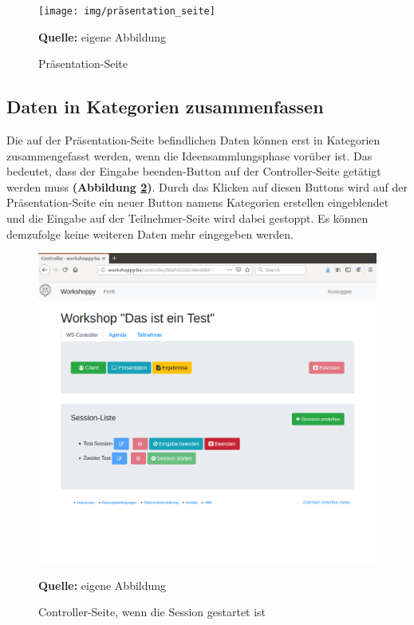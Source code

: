 \begin{figure}[H]
  \begin{center}
    \texttt{[image: img/präsentation\_seite]}
	\caption{Präsentation-Seite} 
	\footnotesize\sffamily\textbf{Quelle:} eigene Abbildung
	\label{fig:Präsentation-Seite final}
  \end{center}   
\end{figure}

\newpage
\subsection{Daten in Kategorien zusammenfassen}
\label{subsec:Daten in Kategorien zusammenfassen}
Die auf der Präsentation-Seite befindlichen Daten können erst in Kategorien zusammengefasst werden, wenn die Ideensammlungsphase vorüber ist. Das bedeutet, dass der \glqq Eingabe beenden\grqq{}-Button auf der Controller-Seite getätigt werden muss \textbf{(Abbildung \ref{fig:controller-Seite mit session final})}. Durch das Klicken auf diesen Buttons wird auf der Präsentation-Seite ein neuer Button namens \glqq Kategorien erstellen\grqq{} eingeblendet und die Eingabe auf der Teilnehmer-Seite wird dabei gestoppt. Es können demzufolge keine weiteren Daten mehr eingegeben werden. 

\bigskip
\begin{figure}[H]
  \begin{center}
    \includegraphics[scale=0.35]{img/controller_seite1}
	\caption{Controller-Seite, wenn die Session gestartet ist} 
	\footnotesize\sffamily\textbf{Quelle:} eigene Abbildung
	\label{fig:controller-Seite mit session final}
  \end{center}   
\end{figure}

